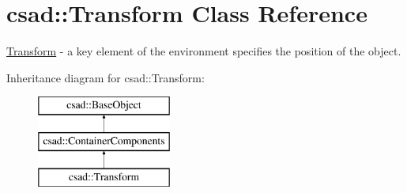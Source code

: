 \hypertarget{classcsad_1_1_transform}{\section{csad\-:\-:Transform Class Reference}
\label{classcsad_1_1_transform}
}


\hyperlink{classcsad_1_1_transform}{Transform} -\/ a key element of the environment specifies the position of the object.  


Inheritance diagram for csad\-:\-:Transform\-:\begin{figure}[H]
\begin{center}
\leavevmode
\includegraphics[height=3.000000cm]{classcsad_1_1_transform}
\end{center}
\end{figure}
